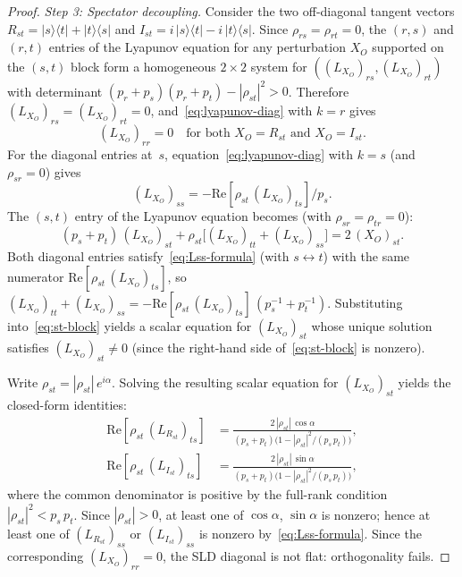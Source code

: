 \documentclass[12pt,a4paper]{article}
\theoremstyle{definition}
\theoremstyle{remark}
\begin{document}
\begin{proof}
\emph{Step 3: Spectator decoupling.}
Consider the two off-diagonal tangent vectors $R_{st} = |s\rangle\langle t| + |t\rangle\langle s|$ and $I_{st} = i\,|s\rangle\langle t| - i\,|t\rangle\langle s|$.  Since $\rho_{rs} = \rho_{rt} = 0$, the $(r,s)$ and $(r,t)$ entries of the Lyapunov equation for any perturbation $X_O$ supported on the $(s,t)$ block form a homogeneous $2 \times 2$ system for $((L_{X_O})_{rs}, (L_{X_O})_{rt})$ with determinant $(p_r + p_s)(p_r + p_t) - |\rho_{st}|^2 > 0$.  Therefore $(L_{X_O})_{rs} = (L_{X_O})_{rt} = 0$, and~\eqref{eq:lyapunov-diag} with $k = r$ gives
\[
(L_{X_O})_{rr} = 0 \quad \text{for both } X_O = R_{st} \text{ and } X_O = I_{st}.
\]
For the diagonal entries at~$s$, equation~\eqref{eq:lyapunov-diag} with $k = s$ (and $\rho_{sr} = 0$) gives
\begin{equation}
\label{eq:Lss-formula}
(L_{X_O})_{ss} = -\mathrm{Re}[\rho_{st}\,(L_{X_O})_{ts}] / p_s.
\end{equation}
The $(s,t)$ entry of the Lyapunov equation becomes (with $\rho_{sr} = \rho_{tr} = 0$):
\begin{equation}
\label{eq:st-block}
(p_s + p_t)\,(L_{X_O})_{st} + \rho_{st}\bigl[(L_{X_O})_{tt} + (L_{X_O})_{ss}\bigr] = 2\,(X_O)_{st}.
\end{equation}
Both diagonal entries satisfy~\eqref{eq:Lss-formula} (with $s \leftrightarrow t$) with the same numerator $\mathrm{Re}[\rho_{st}\,(L_{X_O})_{ts}]$, so $(L_{X_O})_{tt} + (L_{X_O})_{ss} = -\mathrm{Re}[\rho_{st}\,(L_{X_O})_{ts}]\,(p_s^{-1} + p_t^{-1})$.  Substituting into~\eqref{eq:st-block} yields a scalar equation for $(L_{X_O})_{st}$ whose unique solution satisfies $(L_{X_O})_{st} \neq 0$ (since the right-hand side of~\eqref{eq:st-block} is nonzero).

Write $\rho_{st} = |\rho_{st}|\, e^{i\alpha}$.  Solving the resulting scalar equation for $(L_{X_O})_{st}$ yields the closed-form identities:
\begin{align}
\label{eq:Rformula}
\mathrm{Re}[\rho_{st}\,(L_{R_{st}})_{ts}] &= \frac{2\,|\rho_{st}|\,\cos\alpha}{(p_s + p_t)\bigl(1 - |\rho_{st}|^2/(p_s\,p_t)\bigr)}, \\[3pt]
\label{eq:Iformula}
\mathrm{Re}[\rho_{st}\,(L_{I_{st}})_{ts}] &= \frac{2\,|\rho_{st}|\,\sin\alpha}{(p_s + p_t)\bigl(1 - |\rho_{st}|^2/(p_s\,p_t)\bigr)},
\end{align}
where the common denominator is positive by the full-rank condition $|\rho_{st}|^2 < p_s\, p_t$.  Since $|\rho_{st}| > 0$, at least one of $\cos\alpha$, $\sin\alpha$ is nonzero; hence at least one of $(L_{R_{st}})_{ss}$ or $(L_{I_{st}})_{ss}$ is nonzero by~\eqref{eq:Lss-formula}.  Since the corresponding $(L_{X_O})_{rr} = 0$, the SLD diagonal is not flat: orthogonality fails.
\end{proof}
\end{document}
